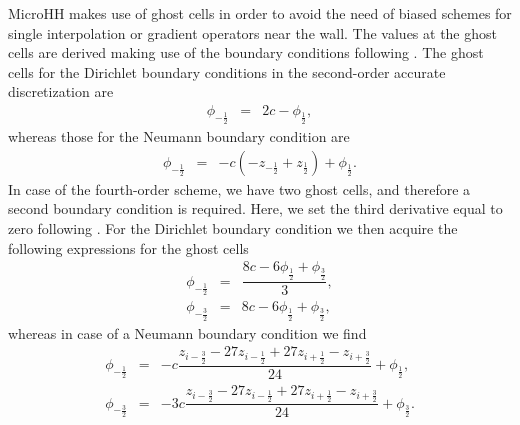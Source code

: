 \documentclass[gmd,manuscript]{copernicus}
\begin{document}
MicroHH makes use of ghost cells in order to avoid the need of biased schemes for single interpolation or gradient operators near the wall. The values at the ghost cells are derived making use of the boundary conditions following \citet{Morinishi1998}. The ghost cells for the Dirichlet boundary conditions in the second-order accurate discretization are
\begin{eqnarray}
\phi_{-\frac{1}{2}} & = & 2 c - \phi_{\frac{1}{2}},
\end{eqnarray}
whereas those for the Neumann boundary condition are
\begin{eqnarray}
\phi_{-\frac{1}{2}} & = & -c \left( - z_{-\frac{1}{2}} + z_{\frac{1}{2}} \right) + \phi_{\frac{1}{2}}.
\end{eqnarray}
In case of the fourth-order scheme, we have two ghost cells, and therefore a second boundary condition is required. Here, we set the third derivative equal to zero following \citep{Morinishi1998}. For the Dirichlet boundary condition we then acquire the following expressions for the ghost cells
\begin{eqnarray}
\phi_{-\frac{1}{2}} & = & \dfrac{8 c - 6 \phi_{\frac{1}{2}} + \phi_{\frac{3}{2}}}{3},\\
\phi_{-\frac{3}{2}} & = & 8 c - 6 \phi_{\frac{1}{2}} + \phi_{\frac{3}{2}},
\end{eqnarray}
whereas in case of a Neumann boundary condition we find
\begin{eqnarray}
\phi_{-\frac{1}{2}} & = & -c  \dfrac{z_{i-\frac{3}{2}} - 27 z_{i-\frac{1}{2}} + 27 z_{i+\frac{1}{2}} - z_{i+\frac{3}{2}}}{24} + \phi_{\frac{1}{2}},\\
\phi_{-\frac{3}{2}} & = & -3c \dfrac{z_{i-\frac{3}{2}} - 27 z_{i-\frac{1}{2}} + 27 z_{i+\frac{1}{2}} - z_{i+\frac{3}{2}}}{24} + \phi_{\frac{3}{2}}.
\end{eqnarray}
\end{document}
